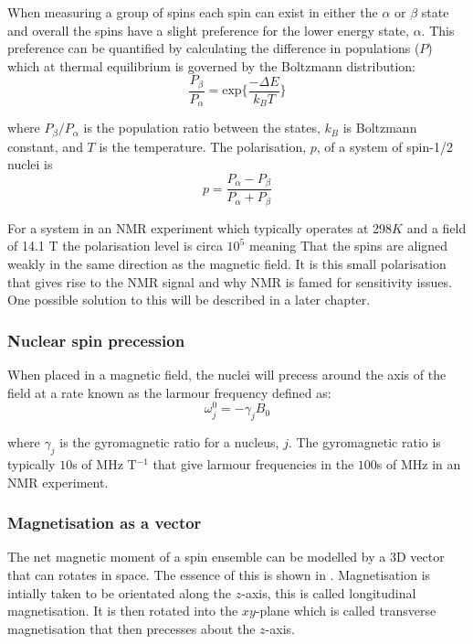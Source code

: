 When measuring a group of spins each spin can exist in either the $\alpha$ or $\beta$ state and overall the spins have a slight preference for the lower energy state, $\alpha$. This preference can be quantified by calculating the difference in populations ($P$) which at thermal equilibrium is governed by the Boltzmann distribution:
\begin{equation}\label{eqn:Boltzmann}
  \frac{P_{\beta}}{P_{\alpha}} = \text{exp}\{\frac{-\Delta{E}}{k_B T}\}
\end{equation}

where $P_{\beta}/P_{\alpha}$ is the population ratio between the states, $k_B$ is Boltzmann constant, and $T$ is the temperature. The polarisation, $p$, of a system of
spin-1/2 nuclei is
\begin{equation}
  p = \frac{P_\alpha - P_\beta}{P_\alpha + P_\beta}
\end{equation}

For a system in an NMR experiment which typically operates at 298$K$ and
a field of 14.1 T the polarisation level is circa $10^5$ meaning That the spins are aligned weakly in the same direction as the magnetic field. It is this small polarisation that gives rise to the NMR signal and why NMR is famed for sensitivity
issues. One possible solution to this will be described in a later chapter.

\subsubsection{Nuclear spin precession}

When placed in a magnetic field, the nuclei will precess around the axis of the field at a rate known as the larmour frequency defined as:
\begin{equation}\label{eqn:larmour}
  \omega_j^0 = -\gamma_jB_0
\end{equation}

where $\gamma_j$ is the gyromagnetic ratio for a nucleus, $j$. The gyromagnetic ratio is
typically $10$s of MHz T$^{-1}$ that give larmour frequencies in the $100$s of MHz in an NMR
experiment.

\subsubsection{Magnetisation as a vector}

The net magnetic moment of a spin ensemble can be modelled by a 3D vector that can rotates in space. The essence of this is shown in . Magnetisation is intially taken to be orientated along the $z$-axis, this is called longitudinal magnetisation. It is then rotated into the $xy$-plane which is called transverse
magnetisation that then precesses about the $z$-axis.

